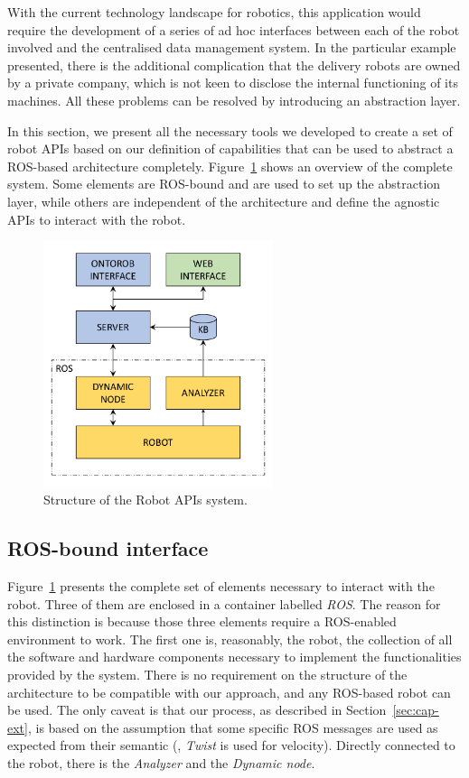 With the current technology landscape for robotics, this application would require the development of a series of ad hoc interfaces between each of the robot involved and the centralised data management system. In the particular example presented, there is the additional complication that the delivery robots are owned by a private company, which is not keen to disclose the internal functioning of its machines.  All these problems can be resolved by introducing an abstraction layer. 

In this section, we present all the necessary tools we developed to create a set of robot APIs based on our definition of capabilities that can be used to abstract a ROS-based architecture completely. Figure~\ref{fig:robot-api} shows an overview of the complete system. Some elements are ROS-bound and are used to set up the abstraction layer, while others are independent of the architecture and define the agnostic APIs to interact with the robot.

\begin{figure}[t]
    \centering
    \includegraphics[width=0.6\textwidth]{gfx/onto/robot_api5}
    \caption{Structure of the Robot APIs system.}\label{fig:robot-api}
\end{figure}

\subsection{ROS-bound interface}
Figure~\ref{fig:robot-api} presents the complete set of elements necessary to interact with the robot. Three of them are enclosed in a container labelled \textit{ROS}. The reason for this distinction is because those three elements require a ROS-enabled environment to work. The first one is, reasonably, the robot, the collection of all the software and hardware components necessary to implement the functionalities provided by the system. There is no requirement on the structure of the architecture to be compatible with our approach, and any ROS-based robot can be used. The only caveat is that our process, as described in Section~\ref{sec:cap-ext}, is based on the assumption that some specific ROS messages are used as expected from their semantic (\eg, \textit{Twist} is used for velocity). Directly connected to the robot, there is the \textit{Analyzer} and the \textit{Dynamic node}.


